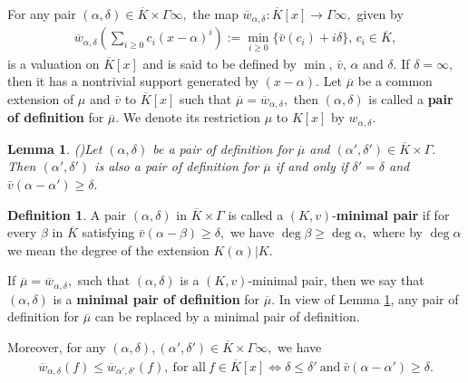 \documentclass[11pt]{amsart}
\newtheorem{lemma}[theorem]{Lemma}
\theoremstyle{definition}
\newtheorem{definition}[theorem]{Definition}
\theoremstyle{remark}
\numberwithin{equation}{section}
\begin{document}
For any pair $(\alpha,\delta)\in\overline{K}\times\Gamma\infty,$ the map $\overline{w}_{\alpha,\delta}: \overline{K}[x]\longrightarrow \Gamma\infty,$ given by
	\begin{align*}
		\overline{w}_{\alpha,\delta}\left(\sum_{i\geq 0} c_i (x-\alpha)^i\right):=\min_{i\geq 0}\{\bar{v}(c_i)+i\delta\}, \, c_i\in\overline{K},
	\end{align*}
	is a valuation on $\overline{K}[x]$ and is said to be defined by $\min,\, \bar{v},\, \alpha$ and $\delta.$ If $\delta=\infty,$ then it has a nontrivial support generated by $(x-\alpha).$
		Let $\overline{\mu}$ be a common extension of $\mu$ and $\bar{v}$ to $\overline{K}[x]$ such that $\overline{\mu}=\overline{w}_{\alpha,\delta},$ then $(\alpha,\delta)$ is called a {\bf pair of definition} for $\overline{\mu}.$ We denote its restriction $\mu$ to $K[x]$ by $w_{\alpha,\delta}.$
	\begin{lemma}(\cite[Lemma 2.4]{W})\label{il1}
		Let $(\alpha,\delta)$ be a pair of definition for $\overline{\mu}$ and $(\alpha',\delta')\in \overline{K}\times\Gamma.$ Then $(\alpha',\delta')$ is also a pair of definition for $\overline{\mu}$ if and only if $\delta'=\delta$ and $\bar{v}(\alpha-\alpha')\geq \delta.$
	\end{lemma}
	
	\begin{definition}
	A pair $(\alpha,\delta)$ in $\overline{K}\times \Gamma$ is called  a $(K,v)$-{\bf minimal pair} if for every $\beta$ in $\overline{K}$ satisfying $\bar{v}(\alpha-\beta)\geq\delta,$ we have  $\deg\beta\geq\deg\alpha,$ where by $\deg\alpha$ we mean the degree of the extension $K(\alpha)|K.$  
\end{definition}

 If $\overline{\mu}=\overline{w}_{\alpha,\delta},$ such that $(\alpha,\delta)$ is a $(K,v)$-minimal pair, then we say that $(\alpha,\delta)$ is a {\bf minimal pair of definition} for $\overline{\mu}.$ In view of Lemma \ref{il1}, any pair of definition for $\overline{\mu}$ can be replaced by a minimal pair of definition.

Moreover, for any $(\alpha,\delta), (\alpha',\delta')\in \overline{K}\times\Gamma\infty,$ we have 
\begin{align}\label{eb}
\overline{w}_{\alpha,\delta}(f)\leq \overline{w}_{\alpha',\delta'}(f),\ \text{for all} \ f\in\overline{K}[x]\iff \delta\leq \delta' \ \text{and} \ \bar{v}(\alpha-\alpha')\geq \delta.	
\end{align}
\end{document}
